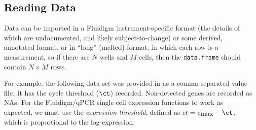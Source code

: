 \documentclass{article}\usepackage[]{graphicx}\usepackage[usenames,dvipsnames]{color}
\begin{document}
\subsection{Reading Data}
Data can be imported in a Fluidigm instrument-specific format (the details of
which are undocumented, and likely subject-to-change) or some derived,
annotated format,  or in ``long'' (melted) format, in which each row is a
measurement, so if there are $N$ wells and $M$ cells, then the
\texttt{data.frame} should contain $N \times M$ rows.

For example, the following data set was provided in as a comma-separated value file.
It has the cycle threshold ($\ct$) recorded. 
Non-detected genes are recorded as NAs.
For the Fluidigm/qPCR single cell expression functions to work as expected, we
must use the \emph{expression threshold}, defined as $et = c_{\mbox{max}} - \ct$, which is proportional to the log-expression.
\end{document}
